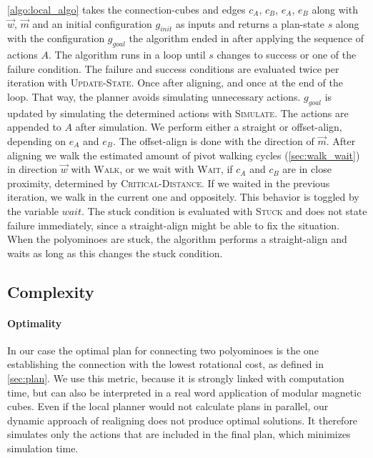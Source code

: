 \autoref{algo:local_algo} takes the connection-cubes and edges $c_A$, $c_B$, $e_A$, $e_B$ along with $\vec{w}$, $\vec{m}$ and an initial configuration $g_{init}$ as inputs and returns a plan-state $s$ along with the configuration $g_{goal}$ the algorithm ended in after applying the sequence of actions $A$.
The algorithm runs in a loop until $s$ changes to success or one of the failure condition.
The failure and success conditions are evaluated twice per iteration with {\scshape Update-State}.
Once after aligning, and once at the end of the loop.
That way, the planner avoids simulating unnecessary actions.
$g_{goal}$ is updated by simulating the determined actions with {\scshape Simulate}.
The actions are appended to $A$ after simulation.
We perform either a straight or offset-align, depending on $e_A$ and $e_B$.
The offset-align is done with the direction of $\vec{m}$.
After aligning we walk the estimated amount of pivot walking cycles (\autoref{sec:walk_wait}) in direction $\vec{w}$ with {\scshape Walk}, or we wait with {\scshape Wait}, if $c_A$ and $c_B$ are in close proximity, determined by {\scshape Critical-Distance}.
If we waited in the previous iteration, we walk in the current one and oppositely.
This behavior is toggled by the variable $wait$. 
The stuck condition is evaluated with {\scshape Stuck} and does not state failure immediately, since a straight-align might be able to fix the situation.
When the polyominoes are stuck, the algorithm performs a straight-align and waits as long as this changes the stuck condition.

\subsection{Complexity}
\label{sec:local_complex}

\paragraph{Optimality}

In our case the optimal plan for connecting two polyominoes is the one establishing the connection with the lowest rotational cost, as defined in \autoref{sec:plan}.
We use this metric, because it is strongly linked with computation time, but can also be interpreted in a real word application of modular magnetic cubes.
Even if the local planner would not calculate plans in parallel, our dynamic approach of realigning does not produce optimal solutions.
It therefore simulates only the actions that are included in the final plan, which minimizes simulation time.


